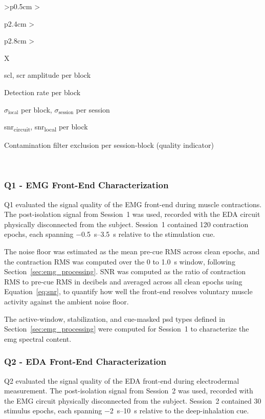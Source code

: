 {\begin{xltabular}{\widetable}{>{\centering\arraybackslash}p{0.5cm} >{\raggedright\arraybackslash}p{2.4cm} >{\raggedright\arraybackslash}p{2.8cm} >{\raggedright\arraybackslash}X}
\begin{tabitemize}
  \item \gls{scl}, \gls{scr} amplitude per block
  \item Detection rate per block
  \item $\sigma_\text{local}$ per block, $\sigma_\text{session}$ per session
  \item \gls{snr}\textsubscript{circuit}, \gls{snr}\textsubscript{local} per block
  \item Contamination filter exclusion per session-block (quality indicator)
\end{tabitemize} \\
\end{xltabular}
}


\FloatBarrier
\subsubsection{Q1 - EMG Front-End Characterization}
\label{sec:q1_emg_frontend_char}

Q1 evaluated the signal quality of the EMG front-end during muscle contractions. The post-isolation signal from Session~1 was used, recorded with the EDA circuit physically disconnected from the subject. Session~1 contained 120 contraction epochs, each spanning \SIrange{-0.5}{+3.5}{\second} relative to the stimulation cue.

The noise floor was estimated as the mean pre-cue RMS across clean epochs, and the contraction RMS was computed over the 0 to \SI{1.0}{\second} window, following Section~\ref{sec:emg_processing}. SNR was computed as the ratio of contraction RMS to pre-cue RMS in decibels and averaged across all clean epochs using Equation~\ref{eq:snr}, to quantify how well the front-end resolves voluntary muscle activity against the ambient noise floor.

The active-window, stabilization, and cue-masked \gls{psd} types defined in Section~\ref{sec:emg_processing} were computed for Session~1 to characterize the \gls{emg} spectral content.
\subsubsection{Q2 - EDA Front-End Characterization}
\label{sec:q2_eda_frontend_char}

Q2 evaluated the signal quality of the EDA front-end during electrodermal measurement. The post-isolation signal from Session~2 was used, recorded with the EMG circuit physically disconnected from the subject. Session~2 contained 30 stimulus epochs, each spanning \SIrange{-2}{+10}{\second} relative to the deep-inhalation cue.

